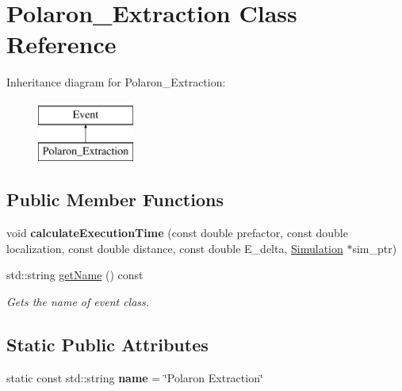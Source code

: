 \hypertarget{class_polaron___extraction}{}\section{Polaron\+\_\+\+Extraction Class Reference}
\label{class_polaron___extraction}
Inheritance diagram for Polaron\+\_\+\+Extraction\+:\begin{figure}[H]
\begin{center}
\leavevmode
\includegraphics[height=2.000000cm]{class_polaron___extraction}
\end{center}
\end{figure}
\subsection*{Public Member Functions}
\begin{DoxyCompactItemize}
\item 
\mbox{\label{class_polaron___extraction_afd2c6e23a838dfb3ea788f1ec3fb360a}} 
void {\bfseries calculate\+Execution\+Time} (const double prefactor, const double localization, const double distance, const double E\+\_\+delta, \hyperlink{class_simulation}{Simulation} $\ast$sim\+\_\+ptr)
\item 
std\+::string \hyperlink{class_polaron___extraction_a30cc8c9489f69e24feda42c035adc9cf}{get\+Name} () const
\begin{DoxyCompactList}\small\item\em Gets the name of event class. \end{DoxyCompactList}\end{DoxyCompactItemize}
\subsection*{Static Public Attributes}
\begin{DoxyCompactItemize}
\item 
\mbox{\label{class_polaron___extraction_a35aa28eda2227a38857f42685597eda2}} 
static const std\+::string {\bfseries name} = \char`\"{}Polaron Extraction\char`\"{}
\end{DoxyCompactItemize}



